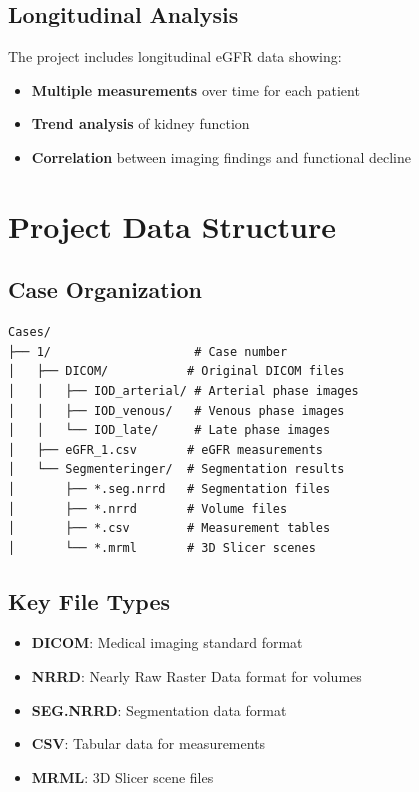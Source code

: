 \documentclass{article}
\begin{document}
\subsection{Longitudinal Analysis}
The project includes longitudinal eGFR data showing:
\begin{itemize}
    \item \textbf{Multiple measurements} over time for each patient
    \item \textbf{Trend analysis} of kidney function
    \item \textbf{Correlation} between imaging findings and functional decline
\end{itemize}

\section{Project Data Structure}

\subsection{Case Organization}
\begin{verbatim}
Cases/
├── 1/                    # Case number
│   ├── DICOM/           # Original DICOM files
│   │   ├── IOD_arterial/ # Arterial phase images
│   │   ├── IOD_venous/   # Venous phase images
│   │   └── IOD_late/     # Late phase images
│   ├── eGFR_1.csv       # eGFR measurements
│   └── Segmenteringer/  # Segmentation results
│       ├── *.seg.nrrd   # Segmentation files
│       ├── *.nrrd       # Volume files
│       ├── *.csv        # Measurement tables
│       └── *.mrml       # 3D Slicer scenes
\end{verbatim}

\subsection{Key File Types}
\begin{itemize}
    \item \textbf{DICOM}: Medical imaging standard format
    \item \textbf{NRRD}: Nearly Raw Raster Data format for volumes
    \item \textbf{SEG.NRRD}: Segmentation data format
    \item \textbf{CSV}: Tabular data for measurements
    \item \textbf{MRML}: 3D Slicer scene files
\end{itemize}
\end{document}

